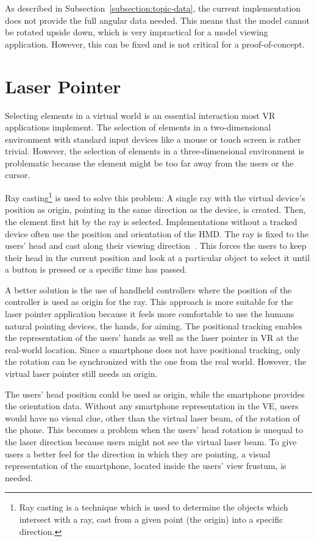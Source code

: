 As described in Subsection~\ref{subsection:topic-data}, the current implementation does not provide the full angular data needed. This means that the model cannot be rotated upside down, which is very impractical for a model viewing application. However, this can be fixed and is not critical for a proof-of-concept.


\section{Laser Pointer}\label{section:laser-pointer}

Selecting elements in a virtual world is an essential interaction most \gls{VR} applications implement. The selection of elements in a two-dimensional environment with standard input devices like a mouse or touch screen is rather trivial. However, the selection of elements in a three-dimensional environment is problematic because the element might be too far away from the users or the cursor.

Ray casting\footnote{Ray casting is a technique which is used to determine the objects which intersect with a ray, cast from a given point (the origin) into a specific direction.} is used to solve this problem: A single ray with the virtual device's position as origin, pointing in the same direction as the device, is created. Then, the element first hit by the ray is selected. Implementations without a tracked device often use the position and orientation of the \gls{HMD}. The ray is fixed to the users' head and cast along their viewing direction~\cite[23]{Kamm.2018}. This forces the users to keep their head in the current position and look at a particular object to select it until a button is pressed or a specific time has passed.

A better solution is the use of handheld controllers where the position of the controller is used as origin for the ray. This approach is more suitable for the laser pointer application because it feels more comfortable to use the humans natural pointing devices, the hands, for aiming. The positional tracking enables the representation of the users' hands as well as the laser pointer in \gls{VR} at the real-world location. Since a smartphone does not have positional tracking, only the rotation can be synchronized with the one from the real world. However, the virtual laser pointer still needs an origin.

The users' head position could be used as origin, while the smartphone provides the orientation data. Without any smartphone representation in the \gls{VE}, users would have no visual clue, other than the virtual laser beam, of the rotation of the phone. This becomes a problem when the users' head rotation is unequal to the laser direction because users might not see the virtual laser beam. To give users a better feel for the direction in which they are pointing, a visual representation of the smartphone, located inside the users' view frustum, is needed.

